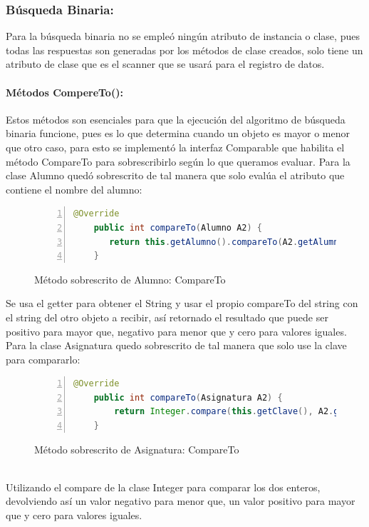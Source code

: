 \documentclass{report}
\begin{document}
\subsubsection{Búsqueda Binaria:}
Para la búsqueda binaria no se empleó ningún atributo de instancia o clase, pues todas las respuestas son generadas por los métodos de clase creados, solo tiene un atributo de clase que es el scanner que se usará para el registro de datos.
\paragraph{Métodos CompereTo():}
Estos métodos son esenciales para que la ejecución del algoritmo de búsqueda binaria funcione, pues es lo que determina cuando un objeto es mayor o menor que otro caso, para esto se implementó la interfaz Comparable que habilita el método CompareTo para sobrescribirlo según lo que queramos evaluar.
Para la clase Alumno quedó sobrescrito de tal manera que solo evalúa el atributo que contiene el nombre del alumno:
\begin{figure}[htbp]
\centering
\begin{lstlisting}[language=Java, frame=lines, framesep=2mm, basicstyle=\footnotesize\ttfamily, numbers=left]
    @Override
    public int compareTo(Alumno A2) {
       return this.getAlumno().compareTo(A2.getAlumno());
    }
\end{lstlisting}
\caption{Método sobrescrito de Alumno: CompareTo}
\end{figure}
Se usa el getter para obtener el String y usar el propio compareTo del string con el string del otro objeto a recibir, así retornado el resultado que puede ser positivo para mayor que, negativo para menor que y cero para valores iguales.
Para la clase Asignatura quedo sobrescrito de tal manera que solo use la clave para compararlo:
\begin{figure}[htbp]
\centering
\begin{lstlisting}[language=Java, frame=lines, framesep=2mm, basicstyle=\footnotesize\ttfamily, numbers=left]
    @Override
    public int compareTo(Asignatura A2) {
        return Integer.compare(this.getClave(), A2.getClave());
    }
\end{lstlisting}
\caption{Método sobrescrito de Asignatura: CompareTo}
\end{figure}
\\Utilizando el compare de la clase Integer para comparar los dos enteros, devolviendo así un valor negativo para menor que, un valor positivo para mayor que y cero para valores iguales. 
\newpage 
\end{document}
